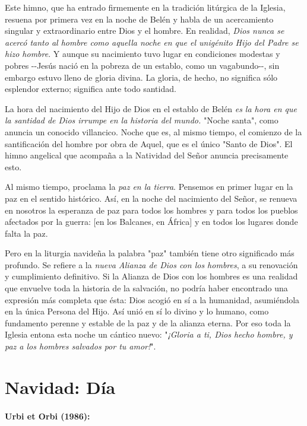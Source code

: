 \begin{body}
\begin{body}
Este himno, que ha entrado firmemente en la tradición litúrgica de la Iglesia, resuena por primera vez en la noche de Belén y habla de un acercamiento singular y extraordinario entre Dios y el hombre. En realidad, \emph{Dios nunca se acercó tanto al hombre como aquella noche en que el unigénito Hijo del Padre se hizo hombre}. Y aunque su nacimiento tuvo lugar en condiciones modestas y pobres -\/-Jesús nació en la pobreza de un establo, como un vagabundo-\/-, sin embargo estuvo lleno de gloria divina. La gloria, de hecho, no significa sólo esplendor externo; significa ante todo santidad.

La hora del nacimiento del Hijo de Dios en el establo de Belén \emph{es la hora en que la santidad de Dios irrumpe en la historia del mundo.} "Noche santa", como anuncia un conocido villancico. Noche que es, al mismo tiempo, el comienzo de la santificación del hombre por obra de Aquel, que es el único "Santo de Dios". El himno angelical que acompaña a la Natividad del Señor anuncia precisamente esto.

Al mismo tiempo, proclama la \emph{paz en la tierra}. Pensemos en primer lugar en la paz en el sentido histórico. Así, en la noche del nacimiento del Señor, se renueva en nosotros la esperanza de paz para todos los hombres y para todos los pueblos afectados por la guerra: {[}en los Balcanes, en África{]} y en todos los lugares donde falta la paz.

Pero en la liturgia navideña la palabra "paz" también tiene otro significado más profundo. Se refiere a la \emph{nueva Alianza de Dios con los hombres}, a su renovación y cumplimiento definitivo. Si la Alianza de Dios con los hombres es una realidad que envuelve toda la historia de la salvación, no podría haber encontrado una expresión más completa que ésta: Dios acogió en sí a la humanidad, asumiéndola en la única Persona del Hijo. Así unió en sí lo divino y lo humano, como fundamento perenne y estable de la paz y de la alianza eterna. Por eso toda la Iglesia entona esta noche un cántico nuevo: "\emph{¡Gloria a ti, Dios hecho hombre, y paz a los hombres salvados por tu amor!}".
\end{body} 
	
\chapter{Navidad: Día}

\subsubsection{Urbi et Orbi (1986): }


\end{body}
